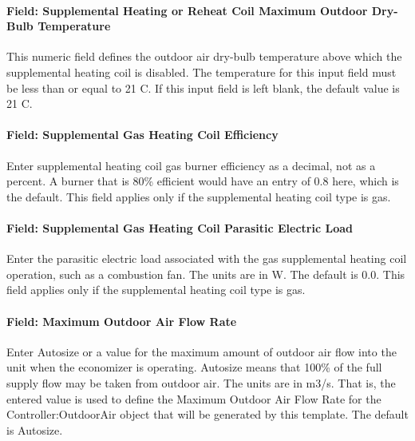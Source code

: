 \paragraph{Field: Supplemental Heating or Reheat Coil Maximum Outdoor Dry-Bulb Temperature}\label{field-supplemental-heating-or-reheat-coil-maximum-outdoor-dry-bulb-temperature}

This numeric field defines the outdoor air dry-bulb temperature above which the supplemental heating coil is disabled. The temperature for this input field must be less than or equal to 21 C. If this input field is left blank, the default value is 21 C.

\paragraph{Field: Supplemental Gas Heating Coil Efficiency}\label{field-supplemental-gas-heating-coil-efficiency-2}

Enter supplemental heating coil gas burner efficiency as a decimal, not as a percent. A burner that is 80\% efficient would have an entry of 0.8 here, which is the default. This field applies only if the supplemental heating coil type is gas.

\paragraph{Field: Supplemental Gas Heating Coil Parasitic Electric Load}\label{field-supplemental-gas-heating-coil-parasitic-electric-load-2}

Enter the parasitic electric load associated with the gas supplemental heating coil operation, such as a combustion fan. The units are in W. The default is 0.0. This field applies only if the supplemental heating coil type is gas.

\paragraph{Field: Maximum Outdoor Air Flow Rate}\label{field-maximum-outdoor-air-flow-rate-2}

Enter Autosize or a value for the maximum amount of outdoor air flow into the unit when the economizer is operating. Autosize means that 100\% of the full supply flow may be taken from outdoor air. The units are in m3/s. That is, the entered value is used to define the Maximum Outdoor Air Flow Rate for the Controller:OutdoorAir object that will be generated by this template. The default is Autosize.

